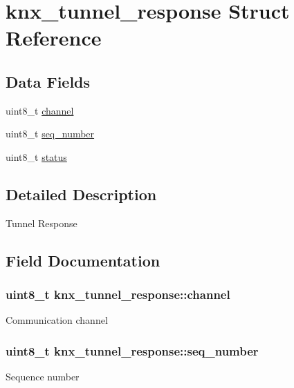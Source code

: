 \hypertarget{structknx__tunnel__response}{}\section{knx\+\_\+tunnel\+\_\+response Struct Reference}
\label{structknx__tunnel__response}
\subsection*{Data Fields}
\begin{DoxyCompactItemize}
\item 
uint8\+\_\+t \hyperlink{structknx__tunnel__response_a206bf44dc9acea81136192c044f6d66c}{channel}
\item 
uint8\+\_\+t \hyperlink{structknx__tunnel__response_a07dfdedf05e12a157df624ea84417b0c}{seq\+\_\+number}
\item 
uint8\+\_\+t \hyperlink{structknx__tunnel__response_ac646034c64b6083aa21e49c22e1d0e50}{status}
\end{DoxyCompactItemize}


\subsection{Detailed Description}
Tunnel Response 

\subsection{Field Documentation}
\subsubsection[{\texorpdfstring{channel}{channel}}]{\setlength{\rightskip}{0pt plus 5cm}uint8\+\_\+t knx\+\_\+tunnel\+\_\+response\+::channel}\hypertarget{structknx__tunnel__response_a206bf44dc9acea81136192c044f6d66c}{}\label{structknx__tunnel__response_a206bf44dc9acea81136192c044f6d66c}
Communication channel 
\subsubsection[{\texorpdfstring{seq\+\_\+number}{seq_number}}]{\setlength{\rightskip}{0pt plus 5cm}uint8\+\_\+t knx\+\_\+tunnel\+\_\+response\+::seq\+\_\+number}\hypertarget{structknx__tunnel__response_a07dfdedf05e12a157df624ea84417b0c}{}\label{structknx__tunnel__response_a07dfdedf05e12a157df624ea84417b0c}
Sequence number 
